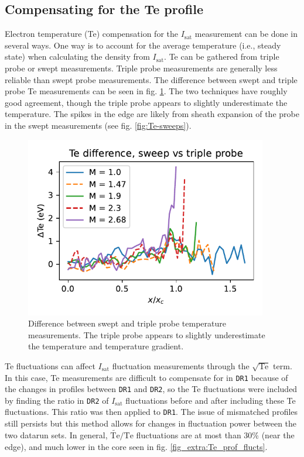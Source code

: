 \subsection{Compensating for the Te profile}

Electron temperature (Te) compensation for the $I_\text{sat}$ measurement can be done in several ways. One way is to account for the average temperature (i.e., steady state) when calculating the density from $I_\text{sat}$. Te can be gathered from triple probe or swept measurements. Triple probe measurements are generally less reliable than swept probe measurements. The difference between swept and triple probe Te measurements can be seen in fig. \ref{fig:Te_swept_vs_triple}. The two techniques have roughly good agreement, though the triple probe appears to slightly underestimate the temperature. The spikes in the edge are likely from sheath expansion of the probe in the swept measurements (see fig. \ref{fig:Te-sweeps}). 

\begin{figure}
    \centering
    \includegraphics[width=300pt]{figures/Te_sweep-TP_diff.pdf}
    \caption[Swept vs triple probe measurements]{Difference between swept and triple probe temperature measurements. The triple probe appears to slightly underestimate the temperature and temperature gradient. }
    \label{fig:Te_swept_vs_triple}
\end{figure}

Te fluctuations can affect $I_\text{sat}$ fluctuation measurements through the $\sqrt{\text{Te}}$ term. In this case, Te measurements are difficult to compensate for in \texttt{DR1} because of the changes in profiles between \texttt{DR1} and \texttt{DR2}, so the Te fluctuations were included by finding the ratio in \texttt{DR2} of $I_\text{sat}$ fluctuations before and after including these Te fluctuations. This ratio was then applied to \texttt{DR1}. The issue of mismatched profiles still persists but this method allows for changes in fluctuation power between the two datarun sets. In general, $\widetilde{\text{Te}} / \text{Te}$ fluctuations are at most than 30\% (near the edge), and much lower in the core seen in fig. \ref{fig_extra:Te_prof_flucts}. 

